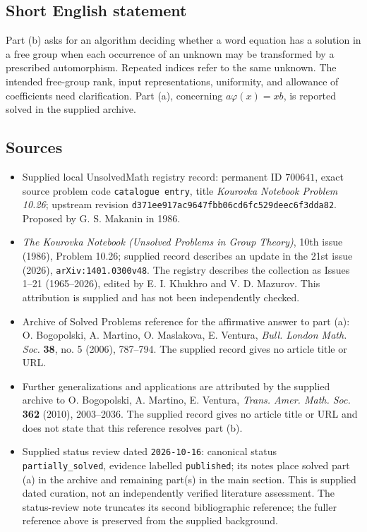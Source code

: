 \documentclass[11pt]{article}
\begin{document}
\subsection{Short English statement}
Part (b) asks for an algorithm deciding whether a word equation has a solution in a free group when each occurrence of an unknown may be transformed by a prescribed automorphism. Repeated indices refer to the same unknown. The intended free-group rank, input representations, uniformity, and allowance of coefficients need clarification. Part (a), concerning \(a\varphi(x)=xb\), is reported solved in the supplied archive.
\subsection{Sources}
\begin{itemize}
\item Supplied local UnsolvedMath registry record: permanent ID \(700641\), exact source problem code \texttt{catalogue entry}, title \emph{Kourovka Notebook Problem 10.26}; upstream revision \texttt{d371ee917ac9647fbb06cd6fc529deec6f3dda82}. Proposed by G. S. Makanin in 1986.
\item \emph{The Kourovka Notebook (Unsolved Problems in Group Theory)}, 10th issue (1986), Problem 10.26; supplied record describes an update in the 21st issue (2026), \texttt{arXiv:1401.0300v48}. The registry describes the collection as Issues 1--21 (1965--2026), edited by E. I. Khukhro and V. D. Mazurov. This attribution is supplied and has not been independently checked.
\item Archive of Solved Problems reference for the affirmative answer to part (a): O. Bogopolski, A. Martino, O. Maslakova, E. Ventura, \emph{Bull. London Math. Soc.} \textbf{38}, no. 5 (2006), 787--794. The supplied record gives no article title or URL.
\item Further generalizations and applications are attributed by the supplied archive to O. Bogopolski, A. Martino, E. Ventura, \emph{Trans. Amer. Math. Soc.} \textbf{362} (2010), 2003--2036. The supplied record gives no article title or URL and does not state that this reference resolves part (b).
\item Supplied status review dated \texttt{2026-10-16}: canonical status \texttt{partially\_solved}, evidence labelled \texttt{published}; its notes place solved part (a) in the archive and remaining part(s) in the main section. This is supplied dated curation, not an independently verified literature assessment. The status-review note truncates its second bibliographic reference; the fuller reference above is preserved from the supplied background.
\end{itemize}
\end{document}
